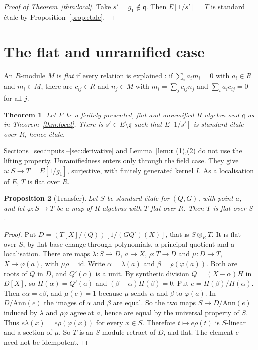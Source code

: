 \documentclass[11pt]{amsart}
\numberwithin{equation}{section}
\newtheorem{theorem}{Theorem}[section]
\newtheorem{proposition}[theorem]{Proposition}
\theoremstyle{definition}
\theoremstyle{remark}
\newcommand{\q}{\mathfrak q}
\begin{document}
\begin{proof}[Proof of Theorem~\ref{thm:local}]
Take $s'=g_1\notin\q$. Then $E[1/s']=T$ is standard \'etale by
Proposition~\ref{prop:etale}.
\end{proof}

\section{The flat and unramified case}\label{sec:flat}

An $R$-module $M$ is \emph{flat} if every relation is explained
\cite{LQ}: if $\sum_ia_im_i=0$ with $a_i\in R$ and $m_i\in M$, there are
$c_{ij}\in R$ and $n_j\in M$ with $m_i=\sum_jc_{ij}n_j$ and
$\sum_ia_ic_{ij}=0$ for all $j$.

\begin{theorem}\label{thm:flat}
Let $E$ be a finitely presented, flat and unramified $R$-algebra and
$\q$ as in Theorem~\ref{thm:local}. There is $s'\in E\setminus\q$ such
that $E[1/s']$ is standard \'etale over $R$, hence \'etale.
\end{theorem}

Sections~\ref{sec:inputs}--\ref{sec:derivative} and
Lemma~\ref{lem:u}(1),(2) do not use the lifting property. Unramifiedness
enters only through the field case. They give $u:S\to T=E[1/g_1]$,
surjective, with finitely generated kernel $I$. As a localisation of
$E$, $T$ is flat over $R$.

\begin{proposition}[Transfer]\label{prop:transfer}
Let $S$ be standard \'etale for $(Q,G)$, with point $a$, and let
$\varphi:S\to T$ be a map of $R$-algebras with $T$ flat over $R$. Then
$T$ is flat over $S$.
\end{proposition}
\begin{proof}
Put $D=(T[X]/(Q))[1/(GQ')(X)]$, that is $S\otimes_RT$. It is flat over
$S$, by flat base change through polynomials, a principal quotient and
a localisation. There are maps $\lambda:S\to D$, $a\mapsto X$,
$\rho:T\to D$ and $\mu:D\to T$, $X\mapsto\varphi(a)$, with
$\mu\rho=\mathrm{id}$. Write $\alpha=\lambda(a)$ and
$\beta=\rho(\varphi(a))$. Both are roots of $Q$ in $D$, and $Q'(\alpha)$ is a
unit. By synthetic division $Q=(X-\alpha)H$ in $D[X]$, so
$H(\alpha)=Q'(\alpha)$ and $(\beta-\alpha)H(\beta)=0$. Put
$e=H(\beta)/H(\alpha)$. Then $e\alpha=e\beta$, and $\mu(e)=1$ because $\mu$
sends $\alpha$ and $\beta$ to $\varphi(a)$. In $D/\mathrm{Ann}(e)$ the
images of $\alpha$ and $\beta$ are equal. So the two maps $S\to D/\mathrm{Ann}(e)$
induced by $\lambda$ and $\rho\varphi$ agree at $a$, hence are equal
by the universal property of $S$. Thus $e\lambda(x)=e\rho(\varphi(x))$
for every $x\in S$. Therefore $t\mapsto e\rho(t)$ is $S$-linear and a
section of $\mu$. So $T$ is an $S$-module retract of $D$, and flat. The
element $e$ need not be idempotent.
\end{proof}
\end{document}
